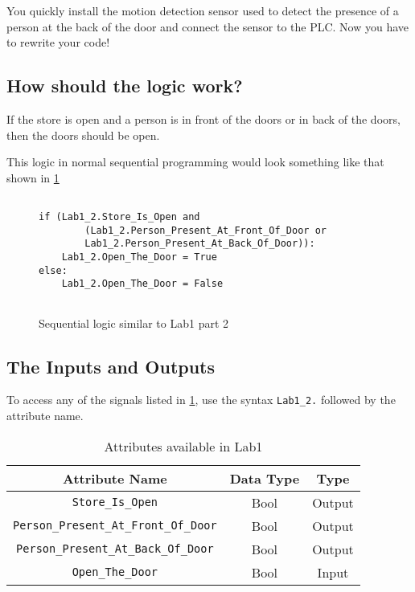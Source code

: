 You quickly install the motion detection sensor used to detect the presence of a person at the back of the door and connect the sensor to the PLC. Now you have to rewrite your code!

\subsection{How should the logic work?}

If the store is open and a person is in front of the doors or in back of the doors, then the doors should be open.

This logic in normal sequential programming would look something like that shown in \figureautorefname \ref{fig:2_2Sequential}

\lstset{style=mystyle}
\lstset{language=python}
\begin{figure}[h]
\begin{lstlisting}[firstnumber=1]

if (Lab1_2.Store_Is_Open and
        (Lab1_2.Person_Present_At_Front_Of_Door or
        Lab1_2.Person_Present_At_Back_Of_Door)):
    Lab1_2.Open_The_Door = True
else:
    Lab1_2.Open_The_Door = False
    
\end{lstlisting}
\caption{Sequential logic similar to Lab1 part 2}
\label{fig:2_2Sequential}
\end{figure}

\subsection{The Inputs and Outputs}

To access any of the signals listed in \tableautorefname \ref{Table:Lab1_2Attributes}, use the syntax \verb|Lab1_2.| followed by the attribute name. 

\begin{table}[h]
\centering
\caption{Attributes available in Lab1}
\label{Table:Lab1_2Attributes}
\begin{tabular}{c c c}
\toprule
Attribute Name & Data Type & Type\\
\midrule
\verb|Store_Is_Open| & Bool & Output \\
\verb|Person_Present_At_Front_Of_Door| &  Bool & Output \\
\verb|Person_Present_At_Back_Of_Door| &  Bool & Output \\
\midrule
\verb|Open_The_Door| & Bool & Input\\
\bottomrule
\end{tabular}
\end{table}

